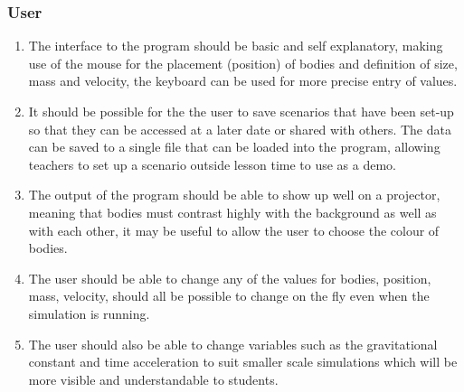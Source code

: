 \subsubsection{User}
\begin{enumerate}
\item The interface to the program should be basic and self explanatory, making use of the mouse for the placement (position) of bodies and definition of size, mass and velocity, the keyboard can be used for more precise entry of values.
\item It should be possible for the the user to save scenarios that have been set-up so that they can be accessed at a later date or shared with others. The data can be saved to a single file that can be loaded into the program, allowing teachers to set up a scenario outside lesson time to use as a demo.
\item The output of the program should be able to show up well on a projector, meaning that bodies must contrast highly with the background as well as with each other, it may be useful to allow the user to choose the colour of bodies.
\item The user should be able to change any of the values for bodies, position, mass, velocity, should all be possible to change on the fly even when the simulation is running.
\item The user should also be able to change variables such as the gravitational constant and time acceleration to suit smaller scale simulations which will be more visible and understandable to students.
\end{enumerate}
